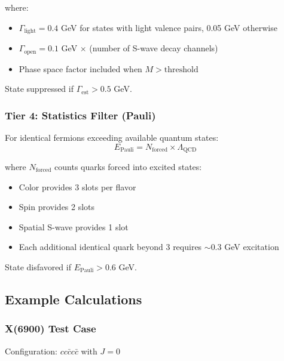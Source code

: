 \documentclass[12pt,a4paper]{article}
\begin{document}
where:
\begin{itemize}
\item $\Gamma_{\text{light}} = 0.4$ GeV for states with light valence pairs, 0.05 GeV otherwise
\item $\Gamma_{\text{open}} = 0.1$ GeV $\times$ (number of S-wave decay channels)
\item Phase space factor included when $M > \text{threshold}$
\end{itemize}

State suppressed if $\Gamma_{\text{est}} > 0.5$ GeV.

\subsubsection{Tier 4: Statistics Filter (Pauli)}

For identical fermions exceeding available quantum states:
\begin{equation}
E_{\text{Pauli}} = N_{\text{forced}} \times \Lambda_{\text{QCD}}
\end{equation}

where $N_{\text{forced}}$ counts quarks forced into excited states:
\begin{itemize}
\item Color provides 3 slots per flavor
\item Spin provides 2 slots  
\item Spatial S-wave provides 1 slot
\item Each additional identical quark beyond 3 requires $\sim 0.3$ GeV excitation
\end{itemize}

State disfavored if $E_{\text{Pauli}} > 0.6$ GeV.

\subsection{Example Calculations}

\subsubsection{X(6900) Test Case}

Configuration: $cc\bar{c}c\bar{c}$ with $J=0$
\end{document}

